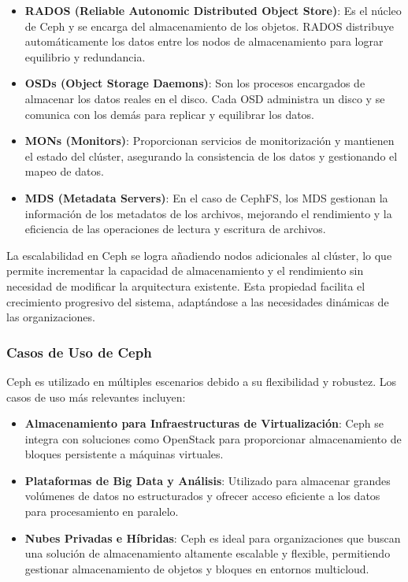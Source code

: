 {                \begin{itemize}
                    \item \textbf{RADOS (Reliable Autonomic Distributed Object Store)}: Es el núcleo de Ceph y se encarga del almacenamiento de los objetos. RADOS distribuye automáticamente los datos entre los nodos de almacenamiento para lograr equilibrio y redundancia.
                    \item \textbf{OSDs (Object Storage Daemons)}: Son los procesos encargados de almacenar los datos reales en el disco. Cada OSD administra un disco y se comunica con los demás para replicar y equilibrar los datos.
                    \item \textbf{MONs (Monitors)}: Proporcionan servicios de monitorización y mantienen el estado del clúster, asegurando la consistencia de los datos y gestionando el mapeo de datos.
                    \item \textbf{MDS (Metadata Servers)}: En el caso de CephFS, los MDS gestionan la información de los metadatos de los archivos, mejorando el rendimiento y la eficiencia de las operaciones de lectura y escritura de archivos.
                \end{itemize}
                
                La escalabilidad en Ceph se logra añadiendo nodos adicionales al clúster, lo que permite incrementar la capacidad de almacenamiento y el rendimiento sin necesidad de modificar la arquitectura existente. Esta propiedad facilita el crecimiento progresivo del sistema, adaptándose a las necesidades dinámicas de las organizaciones.
                
            \subsubsection{Casos de Uso de Ceph}
                Ceph es utilizado en múltiples escenarios debido a su flexibilidad y robustez. Los casos de uso más relevantes incluyen:
                
                \begin{itemize}
                    \item \textbf{Almacenamiento para Infraestructuras de Virtualización}: Ceph se integra con soluciones como OpenStack para proporcionar almacenamiento de bloques persistente a máquinas virtuales.
                    \item \textbf{Plataformas de Big Data y Análisis}: Utilizado para almacenar grandes volúmenes de datos no estructurados y ofrecer acceso eficiente a los datos para procesamiento en paralelo.
                    \item \textbf{Nubes Privadas e Híbridas}: Ceph es ideal para organizaciones que buscan una solución de almacenamiento altamente escalable y flexible, permitiendo gestionar almacenamiento de objetos y bloques en entornos multicloud.
                \end{itemize}
            
}
